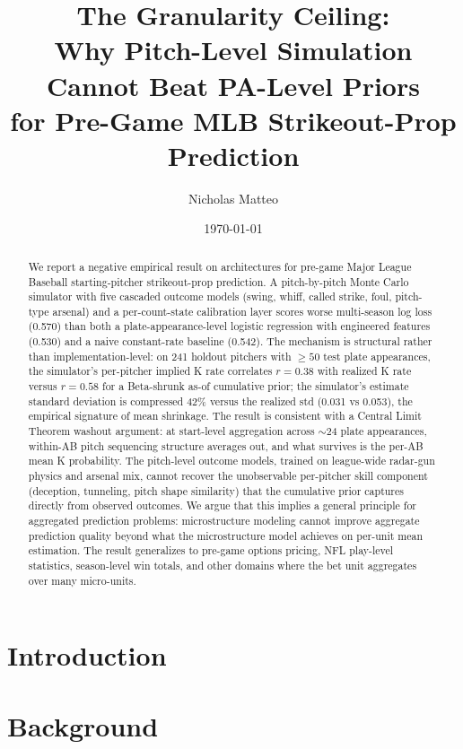 \documentclass[11pt]{article}
\title{The Granularity Ceiling: \\
       Why Pitch-Level Simulation Cannot Beat PA-Level Priors \\
       for Pre-Game MLB Strikeout-Prop Prediction}
\author[1]{Nicholas Matteo}
\affil[1]{Bentley University, Fintech}
\date{\today}
\begin{document}
\maketitle

\begin{abstract}
\noindent We report a negative empirical result on architectures for pre-game
Major League Baseball starting-pitcher strikeout-prop prediction. A pitch-by-pitch
Monte Carlo simulator with five cascaded outcome models (swing, whiff, called
strike, foul, pitch-type arsenal) and a per-count-state calibration layer
scores worse multi-season log loss (0.570) than both a plate-appearance-level
logistic regression with engineered features (0.530) and a naive constant-rate
baseline (0.542). The mechanism is structural rather than implementation-level:
on 241 holdout pitchers with $\geq 50$ test plate appearances, the simulator's
per-pitcher implied K rate correlates $r = 0.38$ with realized K rate versus
$r = 0.58$ for a Beta-shrunk as-of cumulative prior; the simulator's estimate
standard deviation is compressed 42\% versus the realized std (0.031 vs 0.053),
the empirical signature of mean shrinkage. The result is consistent with a Central Limit Theorem
washout argument: at start-level aggregation across $\sim$24 plate appearances,
within-AB pitch sequencing structure averages out, and what survives is the
per-AB mean K probability. The pitch-level outcome models, trained on
league-wide radar-gun physics and arsenal mix, cannot recover the
unobservable per-pitcher skill component (deception, tunneling, pitch shape
similarity) that the cumulative prior captures directly from observed outcomes.
We argue that this implies a general principle for aggregated prediction
problems: microstructure modeling cannot improve aggregate prediction quality
beyond what the microstructure model achieves on per-unit mean estimation.
The result generalizes to pre-game options pricing, NFL play-level statistics,
season-level win totals, and other domains where the bet unit aggregates over
many micro-units.
\end{abstract}

\section{Introduction}

\section{Background}
\end{document}
